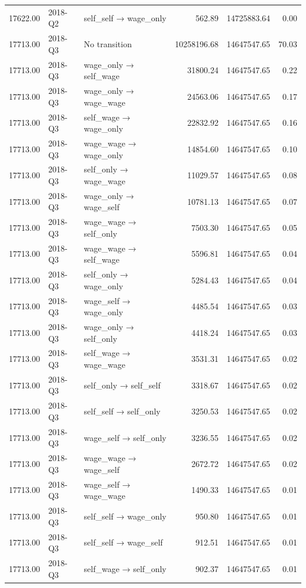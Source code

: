 \begin{table}[ht]
{\begin{tabular}{rllrrr}
  17622.00 & 2018-Q2 & self\_self → wage\_only & 562.89 & 14725883.64 & 0.00 \\ 
  17713.00 & 2018-Q3 & No transition & 10258196.68 & 14647547.65 & 70.03 \\ 
  17713.00 & 2018-Q3 & wage\_only → self\_wage & 31800.24 & 14647547.65 & 0.22 \\ 
  17713.00 & 2018-Q3 & wage\_only → wage\_wage & 24563.06 & 14647547.65 & 0.17 \\ 
  17713.00 & 2018-Q3 & self\_wage → wage\_only & 22832.92 & 14647547.65 & 0.16 \\ 
  17713.00 & 2018-Q3 & wage\_wage → wage\_only & 14854.60 & 14647547.65 & 0.10 \\ 
  17713.00 & 2018-Q3 & self\_only → wage\_wage & 11029.57 & 14647547.65 & 0.08 \\ 
  17713.00 & 2018-Q3 & wage\_only → wage\_self & 10781.13 & 14647547.65 & 0.07 \\ 
  17713.00 & 2018-Q3 & wage\_wage → self\_only & 7503.30 & 14647547.65 & 0.05 \\ 
  17713.00 & 2018-Q3 & wage\_wage → self\_wage & 5596.81 & 14647547.65 & 0.04 \\ 
  17713.00 & 2018-Q3 & self\_only → wage\_only & 5284.43 & 14647547.65 & 0.04 \\ 
  17713.00 & 2018-Q3 & wage\_self → wage\_only & 4485.54 & 14647547.65 & 0.03 \\ 
  17713.00 & 2018-Q3 & wage\_only → self\_only & 4418.24 & 14647547.65 & 0.03 \\ 
  17713.00 & 2018-Q3 & self\_wage → wage\_wage & 3531.31 & 14647547.65 & 0.02 \\ 
  17713.00 & 2018-Q3 & self\_only → self\_self & 3318.67 & 14647547.65 & 0.02 \\ 
  17713.00 & 2018-Q3 & self\_self → self\_only & 3250.53 & 14647547.65 & 0.02 \\ 
  17713.00 & 2018-Q3 & wage\_self → self\_only & 3236.55 & 14647547.65 & 0.02 \\ 
  17713.00 & 2018-Q3 & wage\_wage → wage\_self & 2672.72 & 14647547.65 & 0.02 \\ 
  17713.00 & 2018-Q3 & wage\_self → wage\_wage & 1490.33 & 14647547.65 & 0.01 \\ 
  17713.00 & 2018-Q3 & self\_self → wage\_only & 950.80 & 14647547.65 & 0.01 \\ 
  17713.00 & 2018-Q3 & self\_self → wage\_self & 912.51 & 14647547.65 & 0.01 \\ 
  17713.00 & 2018-Q3 & self\_wage → self\_only & 902.37 & 14647547.65 & 0.01 \\ 

\end{tabular}}
\end{table}
